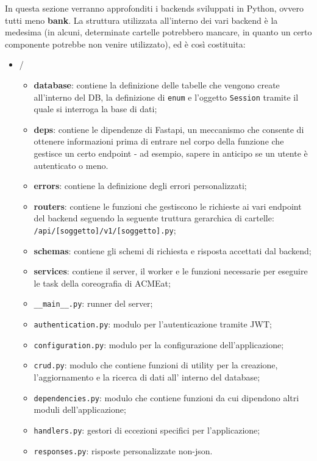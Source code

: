 \documentclass[11pt]{article} %
\begin{document}
In questa sezione verranno approfonditi i backends sviluppati in Python, ovvero tutti meno \textbf{bank}. La struttura utilizzata all'interno dei vari backend è la medesima (in alcuni, determinate cartelle potrebbero mancare, in quanto un certo componente potrebbe non venire utilizzato), ed è così costituita:
\begin{itemize}
\item /
\begin{itemize}
\item \textbf{database}: contiene la definizione delle tabelle che vengono create all'interno del DB, la definizione di \verb|enum| e l'oggetto \verb|Session| tramite il quale si interroga la base di dati;
\item \textbf{deps}: contiene le dipendenze di Fastapi, un meccanismo che consente di ottenere informazioni prima di entrare nel corpo della funzione che gestisce un certo endpoint - ad esempio, sapere in anticipo se un utente è autenticato o meno.
\item \textbf{errors}: contiene la definizione degli errori personalizzati;
\item \textbf{routers}: contiene le funzioni che gestiscono le richieste ai vari endpoint del backend seguendo la seguente truttura gerarchica di cartelle:\\ \verb|/api/[soggetto]/v1/[soggetto].py|;
\item \textbf{schemas}: contiene gli schemi di richiesta e risposta accettati dal backend;
\item \textbf{services}: contiene il server, il worker e le funzioni necessarie per eseguire le task della coreografia di ACMEat;
\item \verb|__main__.py|: runner del server;
\item \verb|authentication.py|: modulo per l'autenticazione tramite JWT;
\item \verb|configuration.py|: modulo per la configurazione dell'applicazione;
\item \verb|crud.py|: modulo che contiene funzioni di utility per la creazione, l'aggiornamento e la ricerca di dati all' interno del database;
\item \verb|dependencies.py|: modulo che contiene funzioni da cui dipendono altri moduli dell'applicazione;
\item \verb|handlers.py|: gestori di eccezioni specifici per l'applicazione;
\item \verb|responses.py|: risposte personalizzate non-json.
\end{itemize}
\end{itemize}
\end{document}

